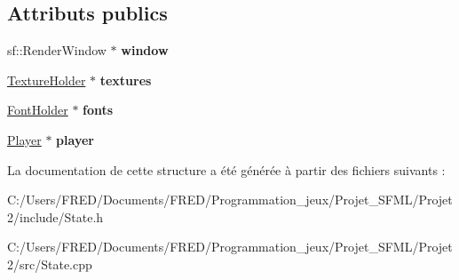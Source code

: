 \subsection*{Attributs publics}
\begin{DoxyCompactItemize}
\item 
sf\+::\+Render\+Window $\ast$ {\bfseries window}\hypertarget{struct_state_1_1_context_a30775e70e841c761a4e3cb7f0e195128}{}\label{struct_state_1_1_context_a30775e70e841c761a4e3cb7f0e195128}

\item 
\hyperlink{class_resource_holder}{Texture\+Holder} $\ast$ {\bfseries textures}\hypertarget{struct_state_1_1_context_a587123ee3b00e8c68c1d99ca6011a53d}{}\label{struct_state_1_1_context_a587123ee3b00e8c68c1d99ca6011a53d}

\item 
\hyperlink{class_resource_holder}{Font\+Holder} $\ast$ {\bfseries fonts}\hypertarget{struct_state_1_1_context_a8b4a94c250018312ccf2e58a33f0c77a}{}\label{struct_state_1_1_context_a8b4a94c250018312ccf2e58a33f0c77a}

\item 
\hyperlink{class_player}{Player} $\ast$ {\bfseries player}\hypertarget{struct_state_1_1_context_a1c98434687748acdebf78fd80a4767ad}{}\label{struct_state_1_1_context_a1c98434687748acdebf78fd80a4767ad}

\end{DoxyCompactItemize}


La documentation de cette structure a été générée à partir des fichiers suivants \+:\begin{DoxyCompactItemize}
\item 
C\+:/\+Users/\+F\+R\+E\+D/\+Documents/\+F\+R\+E\+D/\+Programmation\+\_\+jeux/\+Projet\+\_\+\+S\+F\+M\+L/\+Projet2/include/State.\+h\item 
C\+:/\+Users/\+F\+R\+E\+D/\+Documents/\+F\+R\+E\+D/\+Programmation\+\_\+jeux/\+Projet\+\_\+\+S\+F\+M\+L/\+Projet2/src/State.\+cpp\end{DoxyCompactItemize}
